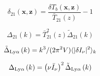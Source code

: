 
\begin{equation}
  \delta_{21}\left(\textbf{x}, \textbf{z} \right) = \frac{\delta T_{b}\left(\textbf{x}, \textbf{z} \right)}{\bar{T}_{21}(z)} - 1
\end{equation}

\begin{equation}
  \Delta_{21} \left( k \right) = \bar{T}_{21}^2(z)\tilde{\Delta}_{21} \left( k \right)
\end{equation}

\begin{equation}
  \tilde{\Delta}_{\rm Ly\alpha} \left( k \right) = k^3 / (2 \pi^2 V) \langle | \delta I_{\nu} |^2 \rangle_k
\end{equation}

\begin{equation}
  \Delta_{\rm Ly\alpha} \left( k \right) = \left(\nu \bar{I}_{\nu} \right)^2\tilde{\Delta}_{\rm Ly\alpha} \left( k \right)
\end{equation}
